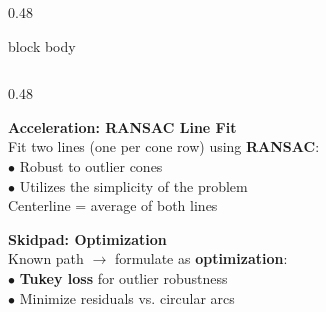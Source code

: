 \documentclass[final]{beamer}
\begin{document}
\begin{frame}[t,fragile]{}
\begin{columns}[t,totalwidth=\textwidth]
\begin{column}{0.48\textwidth}
\begin{beamercolorbox}[rounded=true,sep=0.38cm,wd=\linewidth,ht=37.3cm]{block body}
\begin{columns}[t]
\begin{column}{0.48\linewidth}
  \begin{tcolorbox}[pbox]
    {\color{primary}\bfseries Acceleration: RANSAC Line Fit}\\[3pt]
    \small
    Fit two lines (one per cone row) using \textbf{RANSAC}:\\
    $\bullet$ Robust to outlier cones\\
    $\bullet$ Utilizes the simplicity of the problem\\
    Centerline = average of both lines
  \end{tcolorbox}

  \vspace{0.3cm}
  \begin{tcolorbox}[pbox]
    {\color{primary}\bfseries Skidpad: Optimization}\\[3pt]
    \small
    Known path $\to$ formulate as \textbf{optimization}:\\
    $\bullet$ \textbf{Tukey loss} for outlier robustness\\
    $\bullet$ Minimize residuals vs. circular arcs
  \end{tcolorbox}

  \vspace{8.8cm}
  \centering

\end{column}
\end{columns}
\end{beamercolorbox}
\end{column}
\end{columns}
\end{frame}
\end{document}

